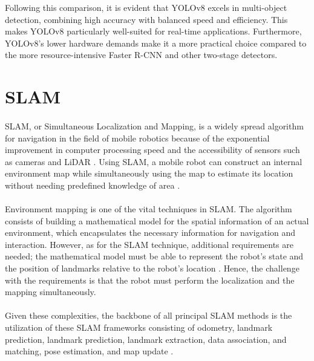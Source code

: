 Following this comparison, it is evident that YOLOv8 excels in multi-object detection, combining high accuracy with balanced speed and efficiency. This makes YOLOv8 particularly well-suited for real-time applications. Furthermore, YOLOv8’s lower hardware demands make it a more practical choice compared to the more resource-intensive Faster R-CNN and other two-stage detectors\cite{kaliappan2023real}.

\section{SLAM}

\paragraph*{}
SLAM, or Simultaneous Localization and Mapping, is a widely spread algorithm for navigation in the field of mobile robotics because of the exponential improvement in computer processing speed and the accessibility of sensors such as cameras and LiDAR \cite{barbadekar2023exploring}. Using SLAM, a mobile robot can construct an internal environment map while simultaneously using the map to estimate its location without needing predefined knowledge of area \cite{durrant2006simultaneous}.

\paragraph*{}
Environment mapping is one of the vital techniques in SLAM. The algorithm consists of building a mathematical model for the spatial information of an actual environment, which encapsulates the necessary information for navigation and interaction. However, as for the SLAM technique, additional requirements are needed; the mathematical model must be able to represent the robot’s state and the position of landmarks relative to the robot’s location \cite{durrant2006simultaneous}. Hence, the challenge with the requirements is that the robot must perform the localization and the mapping simultaneously.

\paragraph*{}
Given these complexities, the backbone of all principal SLAM methods is the utilization of these SLAM frameworks consisting of odometry, landmark prediction, landmark prediction, landmark extraction, data association, and matching, pose estimation, and map update \cite{chong2015sensor}.

